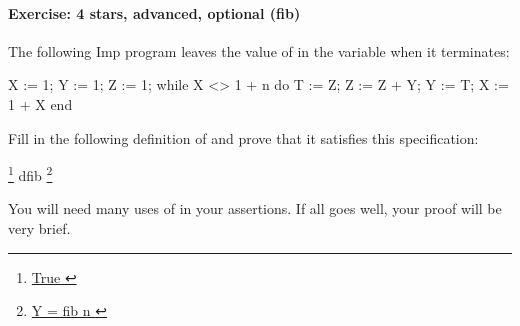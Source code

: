 \documentclass[12pt]{report}
\begin{document}
\paragraph{Exercise: 4 stars, advanced, optional (fib)}




    The following Imp program leaves the value of   in the
    variable  when it terminates:


    X := 1;
    Y := 1;
    Z := 1;
    while X <> 1 + n do
      T := Z;
      Z := Z + Y;
      Y := T;
      X := 1 + X
    end


    Fill in the following definition of  and prove that it
    satisfies this specification:


      \footnote{\url{ True }} dfib \footnote{\url{ Y = fib n }}


    You will need many uses of  in your assertions.
    If all goes well, your proof will be very brief.
\end{document}
